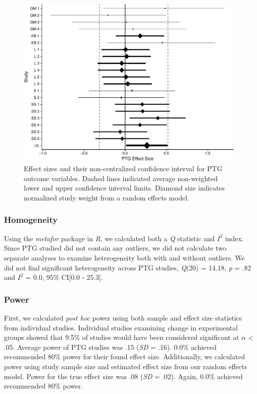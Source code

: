\documentclass[english,man]{apa6}
\theoremstyle{definition}
\theoremstyle{definition}
\theoremstyle{definition}
\theoremstyle{remark}
\begin{document}
\begin{figure}
\centering
\includegraphics{meta_markdown_files/figure-latex/ptgpic-1.pdf}
\caption{\label{fig:ptgpic}Effect sizes and their non-centralized confidence
interval for PTG outcome variables. Dashed lines indicated average
non-weighted lower and upper confidence interval limits. Diamond size
indicates normalized study weight from a random effects model.}
\end{figure}

\subsubsection{Homogeneity}\label{homogeneity-1}

Using the \emph{metafor} package in \emph{R}, we calculated both a
\emph{Q} statistic and \(I^2\) index. Since PTG studied did not contain
any outliers, we did not calculate two separate analyses to examine
heterogeneity both with and without outliers. We did not find
significant heterogeneity across PTG studies, \emph{Q}(20) = 14.18,
\emph{p} = .82 and \(I^2\) = 0.0, 95\% CI{[}0.0 - 25.3{]}.

\subsubsection{Power}\label{power-1}

First, we calculated \emph{post hoc} power using both sample and effect
size statistics from individual studies. Individual studies examining
change in experimental groups showed that 9.5\% of studies would have
been considered significant at \(\alpha\) \textless{} .05. Average power
of PTG studies was .15 (\emph{SD} = .16). 0.0\% achieved recommended
80\% power for their found effect size. Additionally, we calculated
power using study sample size and estimated effect size from our random
effects model. Power for the true effect size was .08 (\emph{SD} = .02).
Again, 0.0\% achieved recommended 80\% power.
\end{document}
